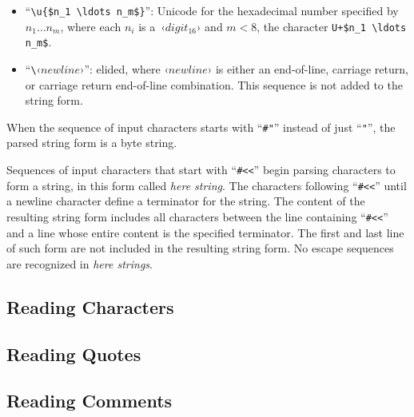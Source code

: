 \begin{itemize}
  \item ``\lstinline!\u{$n_1 \ldots n_m$}!'': Unicode for the hexadecimal number specified by $n_1 \ldots n_m$, where each $n_i$ is a~‹$digit_{16}$› and $m < 8$, the character \lstinline!U+$n_1 \ldots n_m$!.
  
  
  \item ``\lstinline!\!‹$newline$›'': elided, where ‹$newline$› is either an end-of-line, carriage return, or carriage return end-of-line combination. This sequence is not added to the string form.
\end{itemize}

When the sequence of input characters starts with ``\lstinline!#"!'' instead of just ``\lstinline!"!'', the parsed string form is a byte string. %

Sequences of input characters that start with ``\lstinline!#<<!'' begin parsing characters to form a string, in this form called {\em here string}. The characters following ``\lstinline!#<<!'' until a newline character define a terminator for the string. The content of the resulting string form includes all characters between the line containing ``\lstinline!#<<!'' and a line whose entire content is the specified terminator. The first and last line of such form are not included in the resulting string form. No escape sequences are recognized in {\em here strings}. %





\subsection{Reading Characters}
\label{subsec:aml-base-lang-reader-characters}





\subsection{Reading Quotes}
\label{subsec:aml-base-lang-reader-quotes}





\subsection{Reading Comments}
\label{subsec:aml-base-lang-reader-comments}






